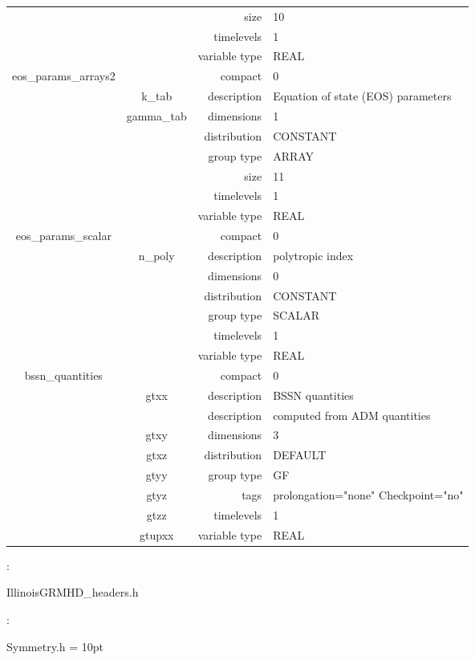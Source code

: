 \begin{tabular*}{150mm}{|c|c@{\extracolsep{\fill}}|rl|}
 &  & size & 10 \\ 
 &  & timelevels & 1 \\ 
 &  & variable type & REAL \\ 
\hline 
eos\_params\_arrays2 &  & compact & 0 \\ 
 & k\_tab & description & Equation of state (EOS) parameters \\ 
 & gamma\_tab & dimensions & 1 \\ 
 &  & distribution & CONSTANT \\ 
 &  & group type & ARRAY \\ 
 &  & size & 11 \\ 
 &  & timelevels & 1 \\ 
 &  & variable type & REAL \\ 
\hline 
eos\_params\_scalar &  & compact & 0 \\ 
 & n\_poly & description & polytropic index \\ 
 &  & dimensions & 0 \\ 
 &  & distribution & CONSTANT \\ 
 &  & group type & SCALAR \\ 
 &  & timelevels & 1 \\ 
 &  & variable type & REAL \\ 
\hline 
bssn\_quantities &  & compact & 0 \\ 
 & gtxx & description & BSSN quantities \\ 
& ~ & description &  computed from ADM quantities \\ 
 & gtxy & dimensions & 3 \\ 
 & gtxz & distribution & DEFAULT \\ 
 & gtyy & group type & GF \\ 
 & gtyz & tags & prolongation="none" Checkpoint="no" \\ 
 & gtzz & timelevels & 1 \\ 
 & gtupxx & variable type & REAL \\ 
\hline 
\end{tabular*} 



\vspace{5mm}

: 



IllinoisGRMHD\_headers.h
\vspace{2mm}

: 

Symmetry.h
\vspace{2mm}\parskip = 10pt 
